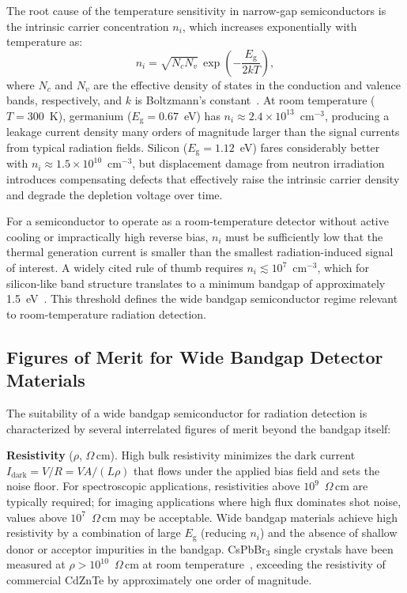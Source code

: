 The root cause of the temperature sensitivity in narrow-gap semiconductors
is the intrinsic carrier concentration $n_i$, which increases
exponentially with temperature as:
\begin{equation}
  n_i = \sqrt{N_c N_v}\,\exp\!\left(-\frac{E_{\mathrm{g}}}{2kT}\right),
  \label{eq:ni}
\end{equation}
where $N_c$ and $N_v$ are the effective density of states in the
conduction and valence bands, respectively, and $k$ is Boltzmann's
constant~\cite{Sze2007}.  At room temperature ($T = 300$~K), germanium
($E_{\mathrm{g}} = 0.67$~eV) has $n_i \approx 2.4 \times 10^{13}$~cm$^{-3}$,
producing a leakage current density many orders of magnitude larger than
the signal currents from typical radiation fields.  Silicon
($E_{\mathrm{g}} = 1.12$~eV) fares considerably better with
$n_i \approx 1.5 \times 10^{10}$~cm$^{-3}$, but displacement damage
from neutron irradiation introduces compensating defects that effectively
raise the intrinsic carrier density and degrade the depletion voltage
over time.

For a semiconductor to operate as a room-temperature detector without
active cooling or impractically high reverse bias, $n_i$ must be
sufficiently low that the thermal generation current is smaller than the
smallest radiation-induced signal of interest.  A widely cited rule of
thumb requires $n_i \lesssim 10^7$~cm$^{-3}$, which for silicon-like
band structure translates to a minimum bandgap of approximately
1.5~eV~\cite{Owens2004}.  This threshold defines the wide bandgap
semiconductor regime relevant to room-temperature radiation detection.

\subsection{Figures of Merit for Wide Bandgap Detector Materials}

The suitability of a wide bandgap semiconductor for radiation detection
is characterized by several interrelated figures of merit beyond the
bandgap itself:

\textbf{Resistivity} ($\rho$, $\Omega$\,cm).  High bulk resistivity
minimizes the dark current $I_{\mathrm{dark}} = V/R = VA/(L\rho)$ that flows
under the applied bias field and sets the noise floor.  For
spectroscopic applications, resistivities above $10^9$~$\Omega$\,cm
are typically required; for imaging applications where high flux
dominates shot noise, values above $10^7$~$\Omega$\,cm may be
acceptable.  Wide bandgap materials achieve high resistivity by a
combination of large $E_{\mathrm{g}}$ (reducing $n_i$) and the absence of
shallow donor or acceptor impurities in the bandgap.  CsPbBr$_3$
single crystals have been measured at $\rho > 10^{10}$~$\Omega$\,cm
at room temperature~\cite{He_NatPhoton_2021}, exceeding the resistivity
of commercial CdZnTe by approximately one order of magnitude.

